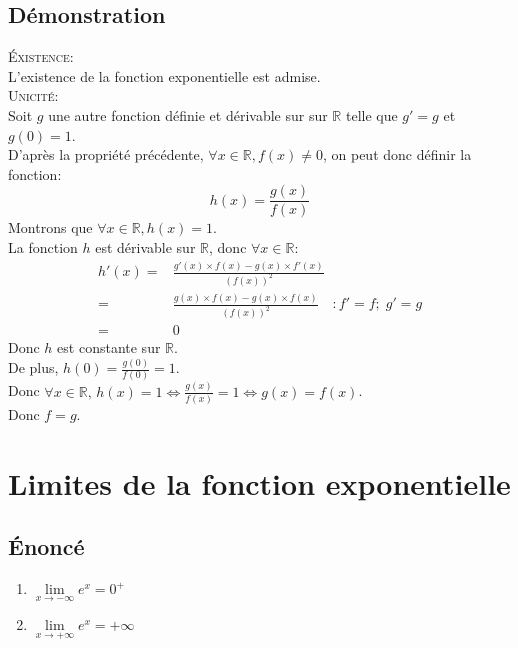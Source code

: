 \documentclass[12px]{article}
\begin{document}
	\subsection{Démonstration}
	\textsc{\'Existence:}\\
	L'existence de la fonction exponentielle est admise.\\
	\textsc{Unicité:}\\
	Soit $g$ une autre fonction définie et dérivable sur sur $\mathbb{R}$ telle que $g'=g$ et $g(0)=1$.\\
	D'après la propriété précédente, $\forall x\in\mathbb{R}, f(x)\not=0$, on peut donc définir la fonction:
	\begin{displaymath}
		h(x)=\frac{g(x)}{f(x)}
	\end{displaymath}
	Montrons que $\forall x\in\mathbb{R}, h(x)=1$.\\
	La fonction $h$ est dérivable sur $\mathbb{R}$, donc $\forall x\in\mathbb{R}$:\\
	\begin{align*}
		h'(x)=&\frac{ g'(x)\times f(x) - g(x)\times f'(x) } { (f(x))^2 }\\
			 =&\frac{ g(x)\times f(x) - g(x)\times f(x) } { (f(x))^2 } \quad :f'=f;\; g'=g\\
			 =&0
	\end{align*}
	Donc $h$ est constante sur $\mathbb{R}$.\\
	De plus, $h(0)=\frac{g(0)}{f(0)}=1$.\\
	Donc $\forall x\in\mathbb{R}, \,h(x)=1 \Leftrightarrow \frac{g(x)}{f(x)}=1 \Leftrightarrow g(x)= f(x)$.\\
	Donc $f=g$.
	
	\section{Limites de la fonction exponentielle}
	
	\subsection{\'Enoncé}
	\begin{enumerate}
		\item $\lim\limits_{x\rightarrow -\infty}e^x = 0^+$
		\item $\lim\limits_{x\rightarrow +\infty}e^x = +\infty$
	\end{enumerate}
	
\end{document}
